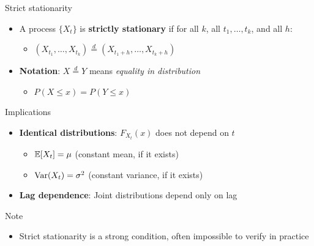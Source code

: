 \documentclass[9pt, aspectratio=169, t]{beamer}
\begin{document}
\begin{frame}{Strict stationarity}
    \vspace{-0.2cm}
    \begin{defn}
        \begin{itemize}\setlength{\itemsep}{0pt}
            \item A process $\{X_t\}$ is \textbf{strictly stationary} if for all $k$, all $t_1, \ldots, t_k$, and all $h$:
            \begin{itemize}
                \item $(X_{t_1}, \ldots, X_{t_k}) \stackrel{d}{=} (X_{t_1+h}, \ldots, X_{t_k+h})$
            \end{itemize}
            \item \textbf{Notation}: $X \stackrel{d}{=} Y$ means \textit{equality in distribution}
            \begin{itemize}
                \item $P(X \leq x) = P(Y \leq x)$
            \end{itemize}
        \end{itemize}
    \end{defn}
    \vspace{-0.1cm}
    \begin{block}{Implications}
            \begin{itemize}\setlength{\itemsep}{0pt}
                \item \textbf{Identical distributions}: $F_{X_t}(x)$ does not depend on $t$
                \begin{itemize}
                    \item $\mathbb{E}[X_t] = \mu$ (constant mean, if it exists)
                    \item $\text{Var}(X_t) = \sigma^2$ (constant variance, if it exists)
                \end{itemize}
                \item \textbf{Lag dependence}: Joint distributions depend only on lag
            \end{itemize}
        \end{block}
    
    \vspace{-0.15cm}

    \begin{alertblock}{Note}
            \begin{itemize}\setlength{\itemsep}{0pt}
                \item Strict stationarity is a strong condition, often impossible to verify in practice
            \end{itemize}
        \end{alertblock}
\end{frame}
\end{document}
